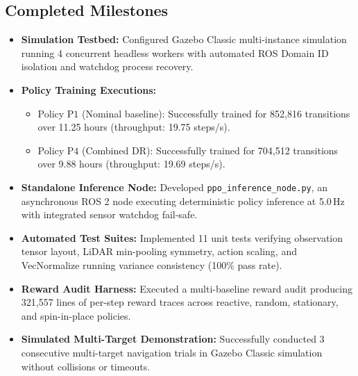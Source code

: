 \documentclass[conference]{IEEEtran}
\begin{document}
\subsection{Completed Milestones}
\begin{itemize}
    \item \textbf{Simulation Testbed:} Configured Gazebo Classic multi-instance simulation running 4 concurrent headless workers with automated ROS Domain ID isolation and watchdog process recovery.
    \item \textbf{Policy Training Executions:}
    \begin{itemize}
        \item Policy $\text{P1}$ (Nominal baseline): Successfully trained for 852,816 transitions over 11.25 hours (throughput: 19.75 steps/s).
        \item Policy $\text{P4}$ (Combined DR): Successfully trained for 704,512 transitions over 9.88 hours (throughput: 19.69 steps/s).
    \end{itemize}
    \item \textbf{Standalone Inference Node:} Developed \texttt{ppo\_inference\_node.py}, an asynchronous ROS 2 node executing deterministic policy inference at 5.0\,Hz with integrated sensor watchdog fail-safe.
    \item \textbf{Automated Test Suites:} Implemented 11 unit tests verifying observation tensor layout, LiDAR min-pooling symmetry, action scaling, and VecNormalize running variance consistency (100\% pass rate).
    \item \textbf{Reward Audit Harness:} Executed a multi-baseline reward audit producing 321,557 lines of per-step reward traces across reactive, random, stationary, and spin-in-place policies.
    \item \textbf{Simulated Multi-Target Demonstration:} Successfully conducted 3 consecutive multi-target navigation trials in Gazebo Classic simulation without collisions or timeouts.
\end{itemize}
\end{document}
